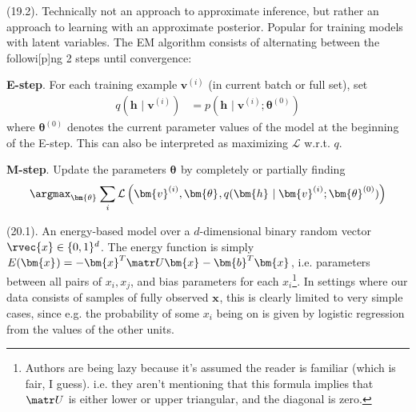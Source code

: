 \documentclass[11pt]{article}
\renewcommand\vec[2][]{\bm{#2}_{#1}}
\newcommand\myspace[1][]{\vspace{#1\bigskipamount}}
\newcommand\p{\Needspace{10\baselineskip} \noindent}
\begin{document}
\myspace
\p {} (19.2). Technically not an approach to approximate inference, but rather an approach to learning with an approximate posterior. Popular for training models with latent variables. The EM algorithm consists of alternating between the followi[p]ng 2 steps until convergence:
\begin{compactenum}
	\item \textbf{E-step}. For each training example $\vec{v}^{(i)}$ (in current batch or full set), set
	\begin{align}
		q(\vec{h} \mid \vec{v}^{(i)}  )
			&= p(\vec{h} \mid \vec{v}^{(i)}; \vec{\theta}^{(0)})
	\end{align}
	where $\vec{\theta}^{(0)}$ denotes the current parameter values of the model at the beginning of the E-step. This can also be interpreted as maximizing $\mathcal L$ w.r.t. $q$. 
	
	\item \textbf{M-step}. Update the parameters $\vec{\theta}$ by completely or partially finding
	\begin{align}
		\argmax_{\vec{\theta}} \sum_i \mathcal{L}\left(\vec{v}^{(i)}, \vec{\theta}, q(\vec{h} \mid \vec{v}^{(i)}; \vec{\theta}^{(0)} ) \right)
	\end{align} 
\end{compactenum}













%
% 


\p {} (20.1). An energy-based model over a $d$-dimensional binary random vector $\rvec{x} \in \{0, 1\}^d$. The energy function is simply $E(\vec{x}) = -\vec{x}^T \matr U \vec x - \vec{b}^T \vec x$, i.e. parameters between all pairs of $x_i, x_j$, and bias parameters for each $x_i$\footnote{Authors are being lazy because it's assumed the reader is familiar (which is fair, I guess). i.e. they aren't mentioning that this formula implies that $\matr U$ is either lower or upper triangular, and the diagonal is zero.}. In settings where our data consists of samples of fully observed $\vec x$, this is clearly limited to very simple cases, since e.g. the probability of some $x_i$ being on is given by logistic regression from the values of the other units. 
\end{document}
